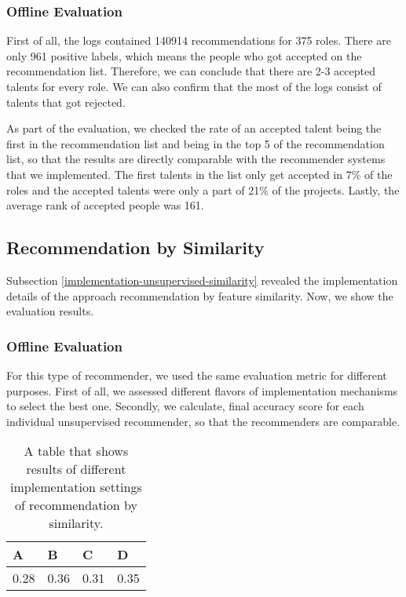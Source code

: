 \subsubsection{Offline Evaluation}

First of all, the logs contained 140914 recommendations for 375 roles. There are only 961 positive labels, which means the people who got accepted on the recommendation list. Therefore, we can conclude that there are 2-3 accepted talents for every role. We can also confirm that the most of the logs consist of talents that got rejected. 

As part of the evaluation, we checked the rate of an accepted talent being the first in the recommendation list and being in the top 5 of the recommendation list, so that the results are directly comparable with the recommender systems that we implemented. The first talents in the list only get accepted in 7\% of the roles and the accepted talents were only a part of 21\% of the projects. Lastly, the average rank of accepted people was 161. 

\subsection{Recommendation by Similarity}\label{ev-rec-sim}

Subsection \ref{implementation-unsupervised-similarity} revealed the implementation details of the approach recommendation by feature similarity. Now, we show the evaluation results. 

\subsubsection{Offline Evaluation}

For this type of recommender, we used the same evaluation metric for different purposes. First of all, we assessed different flavors of implementation mechanisms to select the best one. Secondly, we calculate, final accuracy score for each individual unsupervised recommender, so that the recommenders are comparable.

\begin{table}[htpb]
	\caption[Evaluation mid-results]{A table that shows results of different implementation settings of recommendation by similarity.}\label{tab:evaluation-rec-similarity}
	\centering
	\begin{tabular}{l l l l}
		\toprule
		A & B & C & D \\
		\midrule
		0.28 & 0.36 & 0.31 & 0.35 \\
		\bottomrule
	\end{tabular}
\end{table}

